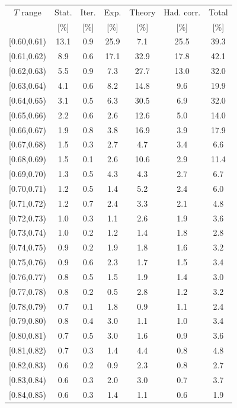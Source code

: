 \begin{table}[t!]
\centering
\scriptsize
\begin{tabular}{c c c c c c c}
\hline
$T$ range & Stat. & Iter. & Exp. & Theory & Had. corr. & Total \\
 & [\%] & [\%] & [\%] & [\%] & [\%] & [\%] \\
\hline
[0.60,0.61) & 13.1 & 0.9 & 25.9 & 7.1 & 25.5 & 39.3 \\
[0.61,0.62) & 8.9 & 0.6 & 17.1 & 32.9 & 17.8 & 42.1 \\
[0.62,0.63) & 5.5 & 0.9 & 7.3 & 27.7 & 13.0 & 32.0 \\
[0.63,0.64) & 4.1 & 0.6 & 8.2 & 14.8 & 9.6 & 19.9 \\
[0.64,0.65) & 3.1 & 0.5 & 6.3 & 30.5 & 6.9 & 32.0 \\
[0.65,0.66) & 2.2 & 0.6 & 2.6 & 12.6 & 5.0 & 14.0 \\
[0.66,0.67) & 1.9 & 0.8 & 3.8 & 16.9 & 3.9 & 17.9 \\
[0.67,0.68) & 1.5 & 0.3 & 2.7 & 4.7 & 3.4 & 6.6 \\
[0.68,0.69) & 1.5 & 0.1 & 2.6 & 10.6 & 2.9 & 11.4 \\
[0.69,0.70) & 1.3 & 0.5 & 4.3 & 4.3 & 2.7 & 6.7 \\
[0.70,0.71) & 1.2 & 0.5 & 1.4 & 5.2 & 2.4 & 6.0 \\
[0.71,0.72) & 1.2 & 0.7 & 2.4 & 3.3 & 2.1 & 4.8 \\
[0.72,0.73) & 1.0 & 0.3 & 1.1 & 2.6 & 1.9 & 3.6 \\
[0.73,0.74) & 1.0 & 0.2 & 1.2 & 1.4 & 1.8 & 2.8 \\
[0.74,0.75) & 0.9 & 0.2 & 1.9 & 1.8 & 1.6 & 3.2 \\
[0.75,0.76) & 0.9 & 0.6 & 2.3 & 1.7 & 1.5 & 3.4 \\
[0.76,0.77) & 0.8 & 0.5 & 1.5 & 1.9 & 1.4 & 3.0 \\
[0.77,0.78) & 0.8 & 0.2 & 0.5 & 2.8 & 1.2 & 3.2 \\
[0.78,0.79) & 0.7 & 0.1 & 1.8 & 0.9 & 1.1 & 2.4 \\
[0.79,0.80) & 0.8 & 0.4 & 3.0 & 1.1 & 1.0 & 3.4 \\
[0.80,0.81) & 0.7 & 0.5 & 3.0 & 1.6 & 0.9 & 3.6 \\
[0.81,0.82) & 0.7 & 0.3 & 1.4 & 4.4 & 0.8 & 4.8 \\
[0.82,0.83) & 0.6 & 0.2 & 0.9 & 2.3 & 0.8 & 2.7 \\
[0.83,0.84) & 0.6 & 0.3 & 2.0 & 3.0 & 0.7 & 3.7 \\
[0.84,0.85) & 0.6 & 0.3 & 1.4 & 1.1 & 0.6 & 1.9 \\

\end{tabular}
\end{table}
